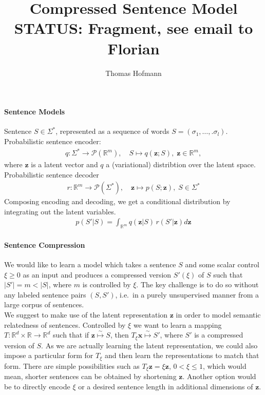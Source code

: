 \documentclass{article}
\title{Compressed Sentence Model \\
STATUS: Fragment, see email to Florian}
\author{Thomas Hofmann}
\renewcommand{\Re}{{\mathbb R}}
\newcommand{\z}{{\mathbf z}}
\newcommand{\x}{{\mathbf x}}
\begin{document}
\maketitle

\paragraph*{Sentence Models} Sentence $S \in \Sigma^*$, represented as a sequence of words $S = (\sigma_1, \dots,. \sigma_l)$. Probabilistic sentence encoder:
\begin{align}
q: \Sigma^* \to \mathcal{P}(\Re^m), \quad S \mapsto q(\z; S), \; \z \in \Re^m, 
\end{align}
where $\z$ is a latent vector and $q$ a (variational) distribtion over the latent space. Probabilistic sentence decoder 
\begin{align}
r: \Re^m \to \mathcal{P}(\Sigma^*), \quad \z \mapsto p(S; \z), \; S \in \Sigma^*
\end{align}
Composing encoding and decoding, we get a conditional distribution by integrating out the latent variables. 
\begin{align}
p(S' | S) = \int_{\Re^m} q(\z|S) \, r(S'|\z) d\z
\end{align}

\paragraph*{Sentence Compression}

We would like to learn a model which takes a sentence $S$ and some scalar control $\xi \ge 0$ as an input and produces a compressed version $S'(\xi)$ of $S$ such that $|S'|=m<|S|$, where $m$ is controlled by $\xi$. The key challenge is to do so without any labeled sentence pairs $(S,S')$, i.e.~in a purely unsupervised manner from a large corpus of sentences.\\

We suggest to make use of the latent representation $\z$ in order to model semantic relatedness of sentences. Controlled by $\xi$ we want to learn a mapping $T: \Re^d \times \Re \to \Re^d$ such that if $\z \stackrel \sim \mapsto S$, then $T_\xi \x \stackrel \sim \mapsto S'$, where $S'$ is a compressed version of $S$. As we are actually learning the latent representation, we could also impose a particular form for $T_\xi$ and then learn the representations to match that form. There are simple possibilities such as $T_\xi \z = \xi \z$, $0 < \xi \le 1$, which would mean, shorter sentences can be obtained by shortening $\z$. Another option would be to directly encode $\xi$ or a desired sentence length in additional dimensions of $\z$. 
\end{document}

